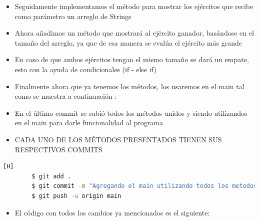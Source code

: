 \documentclass{article}
\begin{document}
    \begin{itemize}
        \item Seguidamente implementamos el método para mostrar los ejércitos que recibe como parámetro un arreglo de Strings
    \end{itemize}    
    

    \begin{itemize}
        \item Ahora añadimos un método que mostrará al ejército ganador, basándose en el tamaño del arreglo, ya que de esa manera se evalúa el ejército más grande
        \item En caso de que ambos ejércitos tengan el mismo tamaño se dará un empate, esto con la ayuda de condicionales (if - else if)
    \end{itemize}    
    

    \begin{itemize}
        \item Finalmente ahora que ya tenemos los métodos, los usaremos en el main tal como se muestra a continuación :
    \end{itemize}    
    

    \begin{itemize}
        \item En el último commit se subió todos los métodos unidos y siendo utilizandos en el main para darle funcionalidad al programa
        \item CADA UNO DE LOS MÉTODOS PRESENTADOS TIENEN SUS RESPECTIVOS COMMITS
    \end{itemize}

    \begin{lstlisting}[language=bash,caption={Commit: Agregando el main utilizando todos los metodos elaborados para terminar con el programa}][H]
		$ git add .
		$ git commit -m "Agregando el main utilizando todos los metodos elaborados para terminar con el programa"
		$ git push -u origin main
	\end{lstlisting}

    \newpage
    \begin{itemize}
        \item El código con todos los cambios ya mencionados es el siguiente: 
    \end{itemize}
	
	
\end{document}
